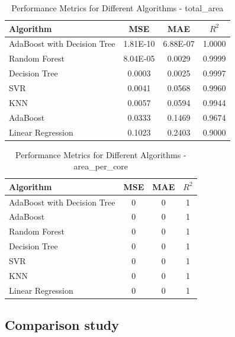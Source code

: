 \documentclass[conference]{IEEEtran}
\begin{document}
\begin{table}[htbp]
	\caption{Performance Metrics for Different Algorithms - total\_area}
	\label{tab:total_area}
	\begin{tabular}{lccc}
		\toprule
		\textbf{Algorithm} & \textbf{MSE} & \textbf{MAE} & \textbf{\(R^2\)} \\
		\midrule
		AdaBoost with Decision Tree & 1.81E-10 & 6.88E-07 & 1.0000 \\
		Random Forest & 8.04E-05 & 0.0029 & 0.9999 \\
		Decision Tree & 0.0003 & 0.0025 & 0.9997 \\
		SVR & 0.0041 & 0.0568 & 0.9960 \\
		KNN & 0.0057 & 0.0594 & 0.9944 \\
		AdaBoost & 0.0333 & 0.1469 & 0.9674 \\
		Linear Regression & 0.1023 & 0.2403 & 0.9000 \\
		\bottomrule
	\end{tabular}
\end{table}

\begin{table}[htbp]

	\caption{Performance Metrics for Different Algorithms - area\_per\_core}
	\label{tab:area_per_core}
	\begin{tabular}{lccc}
		\toprule
		\textbf{Algorithm} & \textbf{MSE} & \textbf{MAE} & \textbf{\(R^2\)} \\
		\midrule
		AdaBoost with Decision Tree & 0 & 0 & 1 \\
		AdaBoost & 0 & 0 & 1 \\
		Random Forest & 0 & 0 & 1 \\
		Decision Tree & 0 & 0 & 1 \\
		SVR & 0 & 0 & 1 \\
		KNN & 0 & 0 & 1 \\
		Linear Regression & 0 & 0 & 1 \\
		\bottomrule
	\end{tabular}
\end{table}

\subsection{Comparison study}
\end{document}
